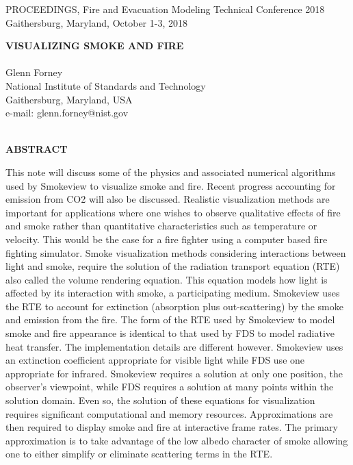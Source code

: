\documentclass[11pt]{article}
\begin{document}



\pagestyle{plain}

%
%
\newcommand{\hhref}[1]{\href{#1}{{\tt #1}}}


\pagestyle{empty}
%
%

\newpage

PROCEEDINGS, Fire and Evacuation Modeling Technical Conference 2018 \\
Gaithersburg, Maryland, October 1-3, 2018

\begin{center}
{\bf VISUALIZING SMOKE AND FIRE} \\
\hspace{1in} \\
Glenn Forney \\
National Institute of Standards and Technology \\
Gaithersburg, Maryland, USA \\
e-mail: glenn.forney@nist.gov \\
\hspace{1in} \\
\end{center}
\begin{center}
{\bf ABSTRACT}\\
\end{center}

This note will discuss some of the physics and associated numerical algorithms used by Smokeview to visualize smoke and fire. Recent progress accounting for emission from CO2 will also be discussed.  Realistic visualization methods are important for applications where one wishes to observe qualitative effects of fire and smoke rather than quantitative characteristics such as temperature or velocity. This would be the case for a fire fighter using a computer based fire fighting simulator.  Smoke visualization methods considering interactions between light and smoke, require the solution of the radiation transport equation (RTE) also called the volume rendering equation. This equation models how light is affected by its interaction with smoke, a participating medium. Smokeview uses the RTE to account for extinction (absorption plus out-scattering) by the smoke and emission from the fire. The form of the RTE used by Smokeview to model smoke and fire appearance is identical to that used by FDS to model radiative heat transfer.  The implementation details are different however.  Smokeview uses an extinction coefficient appropriate for visible light while FDS use one appropriate for infrared. Smokeview requires a solution at only one position, the observer's viewpoint, while FDS requires a solution at many points within the solution domain. Even so, the solution of these equations for visualization requires significant computational and memory resources.  Approximations are then required to display smoke and fire at interactive frame rates. The primary approximation is to take advantage of the low albedo character of smoke allowing one to either simplify or eliminate scattering terms in the RTE.
\end{document}
